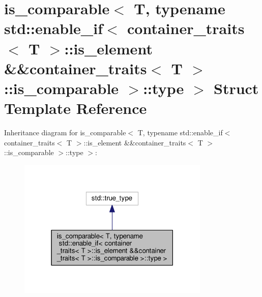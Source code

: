 \hypertarget{structis__comparable_3_01_t_00_01typename_01std_1_1enable__if_3_01container__traits_3_01_t_01_4_e68f35cf826bc3fa92d18aa14a6b9a8a}{}\section{is\+\_\+comparable$<$ T, typename std\+:\+:enable\+\_\+if$<$ container\+\_\+traits$<$ T $>$\+:\+:is\+\_\+element \&\&container\+\_\+traits$<$ T $>$\+:\+:is\+\_\+comparable $>$\+:\+:type $>$ Struct Template Reference}
\label{structis__comparable_3_01_t_00_01typename_01std_1_1enable__if_3_01container__traits_3_01_t_01_4_e68f35cf826bc3fa92d18aa14a6b9a8a}


Inheritance diagram for is\+\_\+comparable$<$ T, typename std\+:\+:enable\+\_\+if$<$ container\+\_\+traits$<$ T $>$\+:\+:is\+\_\+element \&\&container\+\_\+traits$<$ T $>$\+:\+:is\+\_\+comparable $>$\+:\+:type $>$\+:
\nopagebreak
\begin{figure}[H]
\begin{center}
\leavevmode
\includegraphics[width=259pt]{structis__comparable_3_01_t_00_01typename_01std_1_1enable__if_3_01container__traits_3_01_t_01_4_43651805714423c6ead42dd512e2815f}
\end{center}
\end{figure}


